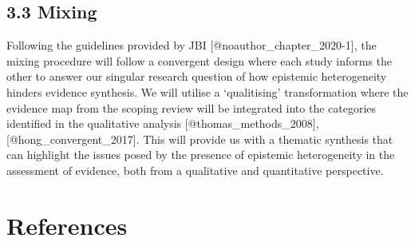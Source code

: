 \documentclass[
  letterpaper,
  DIV=11,
  numbers=noendperiod]{scrartcl}
\begin{document}
\hypertarget{mixing}{%
\subsection{3.3 Mixing}\label{mixing}}

Following the guidelines provided by JBI
{[}@noauthor\_chapter\_2020-1{]}, the mixing procedure will follow a
convergent design where each study informs the other to answer our
singular research question of how epistemic heterogeneity hinders
evidence synthesis. We will utilise a `qualitising' transformation where
the evidence map from the scoping review will be integrated into the
categories identified in the qualitative analysis
{[}@thomas\_methods\_2008{]}, {[}@hong\_convergent\_2017{]}. This will
provide us with a thematic synthesis that can highlight the issues posed
by the presence of epistemic heterogeneity in the assessment of
evidence, both from a qualitative and quantitative perspective.

\hypertarget{references}{%
\section*{References}\label{references}}
\end{document}
